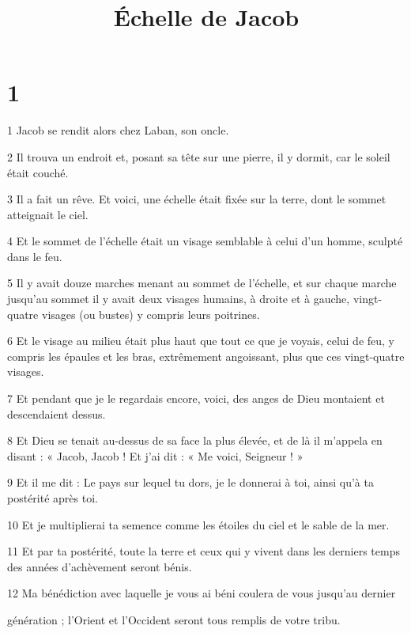 


\title{Échelle de Jacob}

\chapter{1}

\par 1 Jacob se rendit alors chez Laban, son oncle.

\par 2 Il trouva un endroit et, posant sa tête sur une pierre, il y dormit, car le soleil était couché.

\par 3 Il a fait un rêve. Et voici, une échelle était fixée sur la terre, dont le sommet atteignait le ciel.

\par 4 Et le sommet de l'échelle était un visage semblable à celui d'un homme, sculpté dans le feu.

\par 5 Il y avait douze marches menant au sommet de l'échelle, et sur chaque marche jusqu'au sommet il y avait deux visages humains, à droite et à gauche, vingt-quatre visages (ou bustes) y compris leurs poitrines.

\par 6 Et le visage au milieu était plus haut que tout ce que je voyais, celui de feu, y compris les épaules et les bras, extrêmement angoissant, plus que ces vingt-quatre visages.

\par 7 Et pendant que je le regardais encore, voici, des anges de Dieu montaient et descendaient dessus.

\par 8 Et Dieu se tenait au-dessus de sa face la plus élevée, et de là il m'appela en disant : « Jacob, Jacob ! Et j’ai dit : « Me voici, Seigneur ! »

\par 9 Et il me dit : Le pays sur lequel tu dors, je le donnerai à toi, ainsi qu'à ta postérité après toi.

\par 10 Et je multiplierai ta semence comme les étoiles du ciel et le sable de la mer.

\par 11 Et par ta postérité, toute la terre et ceux qui y vivent dans les derniers temps des années d'achèvement seront bénis.

\par 12 Ma bénédiction avec laquelle je vous ai béni coulera de vous jusqu'au dernier
\par génération ; l’Orient et l’Occident seront tous remplis de votre tribu.

